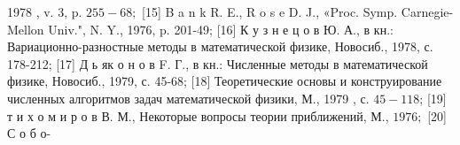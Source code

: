\documentclass[10pt]{article}
\begin{document}
1978 , v. 3, p. $255-68 ;$ [15] B a n k R. E., R o s e D. J., «Proc. Symp. Carnegie-Mellon Univ.", N. Y., 1976, p. 201-49; [16] К у з н е ц о в Ю. А., в кн.: Вариационно-разностные методы в математической физике, Новосиб., 1978, с. 178-212; [17] Д ь як о н о в F. Г., в кн.: Численные методы в математической физике, Новосиб., 1979, с. 45-68; [18] Теоретические основы и конструирование численных алгоритмов задач математической физики, М., 1979 , с. $45-118$; [19] т и х о м и р о в В. М., Некоторые вопросы теории приближений, М., $1976 ;$ [20] С о б о-
\end{document}
